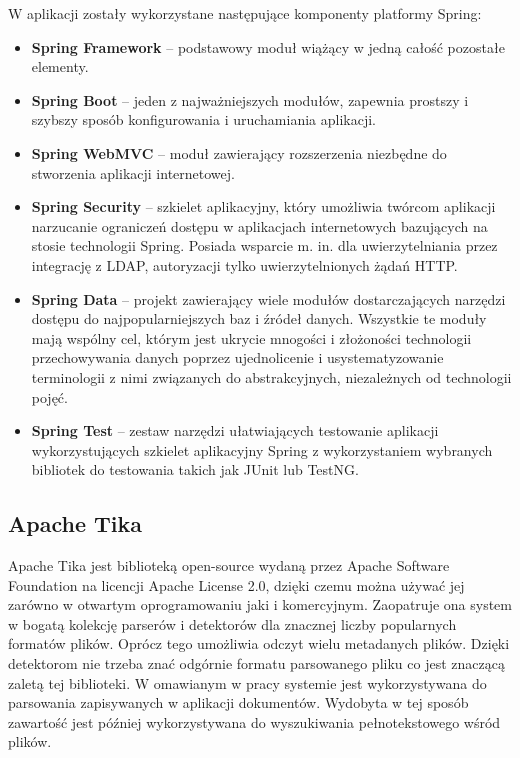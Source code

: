 W aplikacji zostały wykorzystane następujące komponenty platformy Spring:
\begin{itemize}
    \item \textbf{Spring Framework} -- podstawowy moduł wiążący w jedną całość pozostałe elementy.
    \item \textbf{Spring Boot} -- jeden z najważniejszych modułów, zapewnia prostszy i szybszy sposób konfigurowania i uruchamiania aplikacji.
    \item \textbf{Spring WebMVC} -- moduł zawierający rozszerzenia niezbędne do stworzenia aplikacji internetowej.
    \item \textbf{Spring Security} -- szkielet aplikacyjny, który umożliwia twórcom aplikacji narzucanie ograniczeń dostępu w aplikacjach internetowych bazujących na stosie technologii Spring.
    Posiada wsparcie m. in. dla uwierzytelniania przez integrację z LDAP, autoryzacji tylko uwierzytelnionych żądań HTTP.
    \item \textbf{Spring Data} -- projekt zawierający wiele modułów dostarczających narzędzi dostępu do najpopularniejszych baz i źródeł danych. 
    Wszystkie te moduły mają wspólny cel, którym jest ukrycie mnogości i złożoności technologii przechowywania danych poprzez ujednolicenie i usystematyzowanie terminologii z nimi związanych do abstrakcyjnych, niezależnych od technologii pojęć.
    \item \textbf{Spring Test} -- zestaw narzędzi ułatwiających testowanie aplikacji wykorzystujących szkielet aplikacyjny Spring z wykorzystaniem wybranych bibliotek do testowania takich jak JUnit lub TestNG. 
\end{itemize}

\subsection*{Apache Tika}

Apache Tika jest biblioteką open-source wydaną przez Apache Software Foundation na licencji Apache License 2.0, dzięki czemu można używać jej zarówno w otwartym oprogramowaniu jaki i komercyjnym. 
Zaopatruje ona system w bogatą kolekcję parserów i detektorów dla znacznej liczby popularnych formatów plików.
Oprócz tego umożliwia odczyt wielu metadanych plików.
Dzięki detektorom nie trzeba znać odgórnie formatu parsowanego pliku co jest znaczącą zaletą tej biblioteki.
W omawianym w pracy systemie jest wykorzystywana do parsowania zapisywanych w aplikacji dokumentów.
Wydobyta w tej sposób zawartość jest później wykorzystywana do wyszukiwania pełnotekstowego wśród plików.

